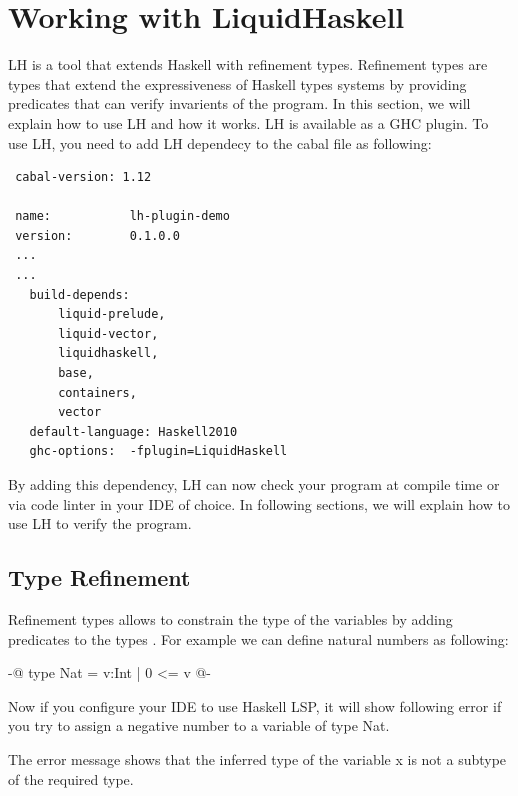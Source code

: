 \documentclass[]{rptuseminar}
\begin{document}
\section{Working with LiquidHaskell}
\label{sec:lh}
LH is a tool that extends Haskell with refinement types. Refinement types are types that extend the expressiveness of Haskell types systems by providing predicates that can verify invarients of the program. In this section, we will explain how to use LH and how it works.
LH is available as a GHC plugin. To use LH, you need to add LH dependecy to the cabal file as following:

\vspace{1em}
\begin{lstlisting}
 cabal-version: 1.12

 name:           lh-plugin-demo
 version:        0.1.0.0
 ...
 ...
   build-depends:
       liquid-prelude,
       liquid-vector,
       liquidhaskell,
       base,
       containers,
       vector
   default-language: Haskell2010
   ghc-options:  -fplugin=LiquidHaskell
\end{lstlisting}
\vspace{1em}

By adding this dependency, LH can now check your program at compile time or via code linter in your IDE of choice. In following sections, we will explain how to use LH to verify the program.
\subsection{Type Refinement}
Refinement types allows to constrain the type of the variables by adding predicates to the types \cite{jhala_programming_2020}. For example we can define natural numbers as following:

\begin{haskell}
 {-@ type Nat = {v:Int | 0 <= v} @-}
\end{haskell}

Now if you configure your IDE to use Haskell LSP, it will show following error if you try to assign a negative number to a variable of type Nat.
The error message shows that the inferred type of the variable x is not a subtype of the required type.
\end{document}
